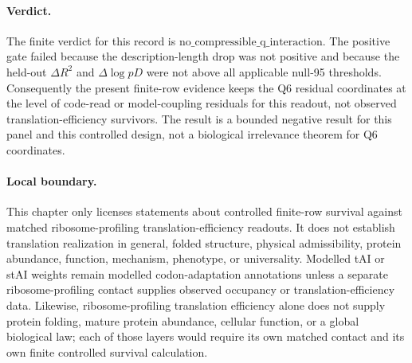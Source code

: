 \paragraph{Verdict.}
The finite verdict for this record is $\mathrm{no\_compressible\_q\_interaction}$.  The positive gate failed because the description-length drop was not positive and because the held-out $\Delta R^2$ and $\Delta \log pD$ were not above all applicable null-95 thresholds.  Consequently the present finite-row evidence keeps the Q6 residual coordinates at the level of code-read or model-coupling residuals for this readout, not observed translation-efficiency survivors.  The result is a bounded negative result for this panel and this controlled design, not a biological irrelevance theorem for Q6 coordinates.

\paragraph{Local boundary.}
This chapter only licenses statements about controlled finite-row survival against matched ribosome-profiling translation-efficiency readouts.  It does not establish translation realization in general, folded structure, physical admissibility, protein abundance, function, mechanism, phenotype, or universality.  Modelled tAI or stAI weights remain modelled codon-adaptation annotations unless a separate ribosome-profiling contact supplies observed occupancy or translation-efficiency data.  Likewise, ribosome-profiling translation efficiency alone does not supply protein folding, mature protein abundance, cellular function, or a global biological law; each of those layers would require its own matched contact and its own finite controlled survival calculation.

